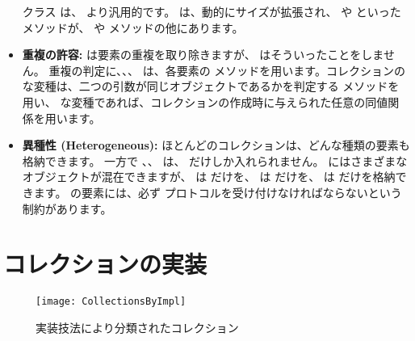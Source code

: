 \documentclass[a4paper,10pt,twoside]{book}
\begin{document}
\begin{itemize}
         クラス は、 より汎用的です。 は、動的にサイズが拡張され、 や  といったメソッドが、 や  メソッドの他にあります。
  
  \item {\bf 重複の許容:}
  	 は要素の重複を取り除きますが、 はそういったことをしません。
	重複の判定に、、、 は、各要素の \ct{=} メソッドを用います。コレクションの  な変種は、二つの引数が同じオブジェクトであるかを判定する \ct{==} メソッドを用い、 な変種であれば、コレクションの作成時に与えられた任意の同値関係を用います。

  \item {\bf 異種性 (Heterogeneous):}
        ほとんどのコレクションは、どんな種類の要素も格納できます。
        一方で 、、 は、 だけしか入れられません。
         にはさまざまなオブジェクトが混在できますが、 は  だけを、 は  だけを、 は  だけを格納できます。
	 の要素には、必ず  プロトコルを受け付けなければならないという制約があります。

\end{itemize}


\section{コレクションの実装}

\begin{figure*}
\begin{center}
\texttt{[image: CollectionsByImpl]}
\caption{実装技法により分類されたコレクション%
    }
\end{center}
\end{figure*}
\end{document}
